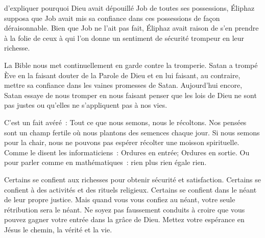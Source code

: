 \dvrule






 d'expliquer pourquoi Dieu avait dépouillé Job
 de toutes ses possessions, Éliphaz supposa que Job avait mis sa confiance
 dans ces possessions de façon déraisonnable.
 Bien que Job ne l'ait pas fait, Éliphaz avait raison de s'en prendre
 à la folie de ceux à qui l'on donne un sentiment de sécurité trompeur
 en leur richesse. 

La Bible nous met continuellement en garde contre la tromperie.
 Satan a trompé Ève en la faisant douter de la Parole de Dieu
 et en lui faisant, au contraire, mettre sa confiance dans les vaines
 promesses de Satan.
 Aujourd'hui encore, Satan essaye de nous tromper en nous faisant penser
 que les lois de Dieu ne sont pas justes ou qu'elles ne s'appliquent
 pas à nos vies. 


C'est un fait avéré~: Tout ce que nous semons, nous le récoltons.
 Nos pensées sont un champ fertile où nous plantons des semences chaque jour.
 Si nous semons pour la chair, nous ne pouvons pas espérer récolter
 une moisson spirituelle.
 Comme le disent les informaticiens~:
 \og Ordures en entrée; Ordures en sortie. \fg{}
 Ou pour parler comme en mathématiques~: rien plus rien égale rien. 

Certains se confient aux richesses pour obtenir sécurité et satisfaction.
 Certains se confient à des activités et des rituels religieux.
 Certains se confient dans le néant de leur propre justice.
 Mais quand vous vous confiez au néant, votre seule rétribution sera le néant.
 Ne soyez pas faussement conduits à croire que vous pouvez gagner
 votre entrée dans la grâce de Dieu.
 Mettez votre espérance en Jésus \ocadr{}le chemin, la vérité et la vie.

\dvrule



